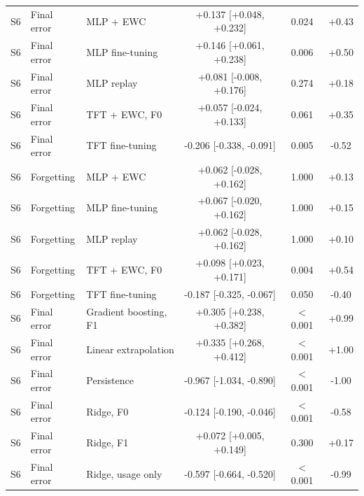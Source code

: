 \begin{table}[t]
\begin{tabular}{lllccc}
    \midrule
    S6 & Final error & MLP + EWC & +0.137 [+0.048, +0.232] & 0.024 & +0.43 \\
    S6 & Final error & MLP fine-tuning & +0.146 [+0.061, +0.238] & 0.006 & +0.50 \\
    S6 & Final error & MLP replay & +0.081 [-0.008, +0.176] & 0.274 & +0.18 \\
    S6 & Final error & TFT + EWC, F0 & +0.057 [-0.024, +0.133] & 0.061 & +0.35 \\
    S6 & Final error & TFT fine-tuning & -0.206 [-0.338, -0.091] & 0.005 & -0.52 \\
    S6 & Forgetting & MLP + EWC & +0.062 [-0.028, +0.162] & 1.000 & +0.13 \\
    S6 & Forgetting & MLP fine-tuning & +0.067 [-0.020, +0.162] & 1.000 & +0.15 \\
    S6 & Forgetting & MLP replay & +0.062 [-0.028, +0.162] & 1.000 & +0.10 \\
    S6 & Forgetting & TFT + EWC, F0 & +0.098 [+0.023, +0.171] & 0.004 & +0.54 \\
    S6 & Forgetting & TFT fine-tuning & -0.187 [-0.325, -0.067] & 0.050 & -0.40 \\
    S6 & Final error & Gradient boosting, F1 & +0.305 [+0.238, +0.382] & $<$0.001 & +0.99 \\
    S6 & Final error & Linear extrapolation & +0.335 [+0.268, +0.412] & $<$0.001 & +1.00 \\
    S6 & Final error & Persistence & -0.967 [-1.034, -0.890] & $<$0.001 & -1.00 \\
    S6 & Final error & Ridge, F0 & -0.124 [-0.190, -0.046] & $<$0.001 & -0.58 \\
    S6 & Final error & Ridge, F1 & +0.072 [+0.005, +0.149] & 0.300 & +0.17 \\
    S6 & Final error & Ridge, usage only & -0.597 [-0.664, -0.520] & $<$0.001 & -0.99 \\
    \bottomrule
  \end{tabular}
\end{table}
